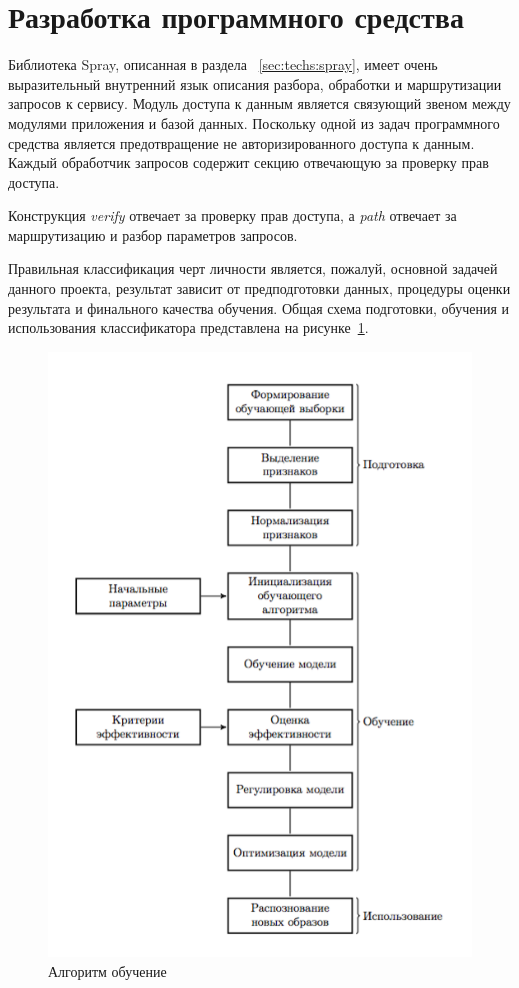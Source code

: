 \section{Разработка программного средства}
Библиотека Spray, описанная в раздела ~\ref{sec:techs:spray}, имеет очень выразительный внутренний язык описания разбора, обработки и маршрутизации запросов к сервису. Модуль доступа к данным является связующий звеном между модулями приложения и базой данных. Поскольку одной из задач программного средства является предотвращение не авторизированного доступа к данным. Каждый обработчик запросов содержит секцию отвечающую за проверку прав доступа.

Конструкция \emph{verify} отвечает за проверку прав доступа, а \emph{path} отвечает за маршрутизацию и разбор параметров запросов.

Правильная классификация черт личности является, пожалуй, основной задачей данного проекта, результат зависит от предподготовки данных, процедуры оценки результата и финального качества обучения. Общая схема подготовки, обучения и использования классификатора представлена на рисунке~\ref{fig:develoipment:svm_flow}.

\begin{figure}[ht]
    \centering
    \label{fig:develoipment:svm_flow}
    \includegraphics[width=1\textwidth]{figures/SVM_flow.png}
    \caption{Алгоритм обучение}
\end{figure}

